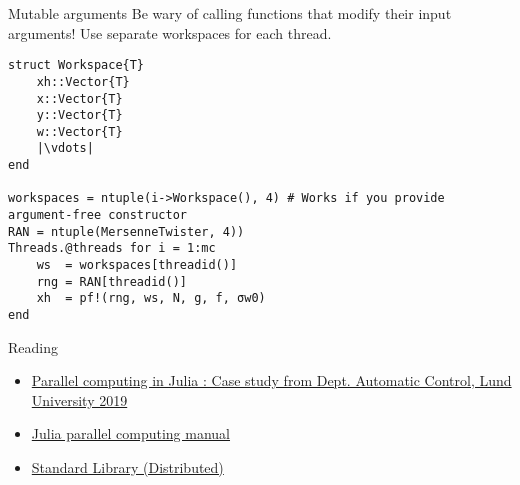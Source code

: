 \documentclass[10pt]{beamer}
\begin{document}
\begin{frame}[fragile]{Mutable arguments}{}
    Be wary of calling functions that modify their input arguments! Use separate workspaces for each thread.
\begin{verbatim}
struct Workspace{T}
    xh::Vector{T}
    x::Vector{T}
    y::Vector{T}
    w::Vector{T}
    |\vdots|
end

workspaces = ntuple(i->Workspace(), 4) # Works if you provide argument-free constructor
RAN = ntuple(MersenneTwister, 4))
Threads.@threads for i = 1:mc
	ws  = workspaces[threadid()]
	rng = RAN[threadid()]
	xh  = pf!(rng, ws, N, g, f, σw0)
end
\end{verbatim}

\end{frame}



\begin{frame}{Reading}{}
	\begin{itemize}
		\item \href{https://lup.lub.lu.se/search/publication/873af4d5-6229-4ad2-b907-c0ae0f667822}{Parallel computing in Julia : Case study from Dept. Automatic Control, Lund University 2019}
		\item \href{https://docs.julialang.org/en/v1/manual/parallel-computing/}{Julia parallel computing manual}
		\item \href{https://docs.julialang.org/en/v1/stdlib/Distributed/}{Standard Library (Distributed)}
\end{itemize}
\end{frame}
\end{document}
